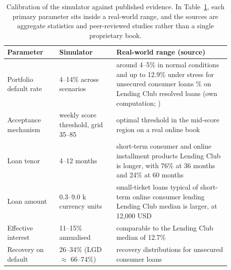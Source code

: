 \documentclass[preprint,review,authoryear,12pt]{elsarticle}
\begin{document}
\begin{table}[H]
    \centering
    \footnotesize
    \setlength{\tabcolsep}{4pt}
    \renewcommand{\arraystretch}{1.15}
    \caption{Calibration of the simulator against published evidence. In Table~\ref{tab:calibration}, each primary parameter sits inside a real-world range, and the sources are aggregate statistics and peer-reviewed studies rather than a single proprietary book.}
    \label{tab:calibration}
    \begin{tabular}{p{0.215\linewidth} p{0.235\linewidth} p{0.46\linewidth}}
        \toprule
        Parameter              & Simulator                           & Real-world range (source)                                                                                     \\
        \midrule
        Portfolio default rate & 4--14\% across scenarios            & around 4--5\% in normal conditions and up to 12.9\% under stress for unsecured consumer loans \citep{cbr2025}
        \newline 20.0\% on Lending Club resolved loans (own computation; \citealp{xia2017})                                                                                          \\
        Acceptance mechanism   & weekly score threshold, grid 35--85 & optimal threshold in the mid-score region on a real online book \citep{herasymovych2019}                      \\
        Loan tenor             & 4--12 months                        & short-term consumer and online installment products \citep{herasymovych2019}
        \newline Lending Club is longer, with 76\% at 36 months and 24\% at 60 months                                                                                                \\
        Loan amount            & 0.3--9.0 k currency units           & small-ticket loans typical of short-term online consumer lending \citep{herasymovych2019}
        \newline Lending Club median is larger, at 12{,}000 USD                                                                                                                      \\
        Effective interest     & 11--15\% annualised                 & comparable to the Lending Club median of 12.7\%                                                               \\
        Recovery on default    & 26--34\% (LGD $\approx$ 66--74\%)   & recovery distributions for unsecured consumer loans \citep{loterman2012, qi2011}                              \\
        \bottomrule
    \end{tabular}
\end{table}
\end{document}
